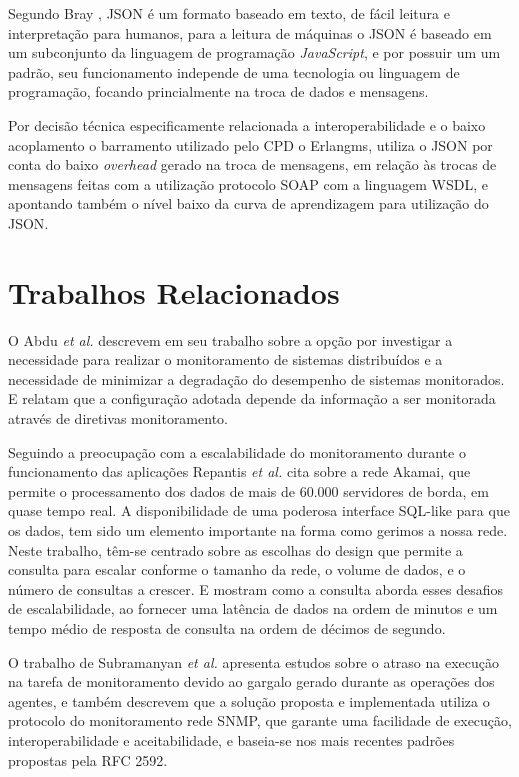 Segundo Bray \cite{bray2017javascript}, \acrfull{JSON} é um formato baseado em texto, de fácil leitura e interpretação para humanos, para a leitura de máquinas o \acrshort{JSON} é baseado em um subconjunto da linguagem de programação \textit{JavaScript}, e por possuir um um padrão, seu funcionamento independe de uma tecnologia ou linguagem de programação, focando princialmente na troca de dados e mensagens.

Por decisão técnica especificamente relacionada a interoperabilidade e o baixo acoplamento o barramento utilizado pelo \acrshort{CPD} o Erlangms, utiliza o \acrshort{JSON} por conta do  baixo \textit{overhead} gerado na troca de mensagens, em relação às trocas de mensagens feitas com a utilização protocolo \acrshort{SOAP} com a linguagem \acrshort{WSDL}, e apontando também o nível baixo da curva de aprendizagem para utilização do \acrshort{JSON}.


\section{Trabalhos Relacionados}

O Abdu \textit{et al.} \cite{abdu1996monitoring} descrevem em seu trabalho sobre a opção por investigar a necessidade para realizar o monitoramento de sistemas distribuídos e a necessidade de minimizar a degradação do desempenho de sistemas monitorados. E relatam que a configuração adotada depende da informação a ser monitorada através de diretivas monitoramento.

Seguindo a preocupação com a escalabilidade do monitoramento durante o funcionamento das aplicações Repantis \textit{et al.} \cite{repantis2010scaling} cita sobre a rede Akamai, que permite o processamento dos dados de mais de 60.000 servidores de borda, em quase tempo real. A disponibilidade de uma poderosa interface SQL-like para que os dados, tem sido um elemento importante na forma como gerimos a nossa rede. Neste trabalho, têm-se centrado sobre as escolhas do design que permite a consulta para escalar conforme o tamanho da rede, o volume de dados, e o número de consultas a crescer. E mostram como a consulta aborda esses desafios de escalabilidade, ao fornecer uma latência de dados na ordem de minutos e um tempo médio de resposta de consulta na ordem de décimos de segundo.

O trabalho de Subramanyan \textit{et al.} \cite{subramanyan2000scalable} apresenta estudos sobre o atraso na execução na tarefa de monitoramento devido ao gargalo gerado durante as operações dos agentes, e também descrevem que a solução proposta e implementada utiliza o protocolo do monitoramento rede \acrshort{SNMP}, que garante uma facilidade de execução, interoperabilidade e aceitabilidade, e baseia-se nos mais recentes padrões propostas pela RFC 2592.  

